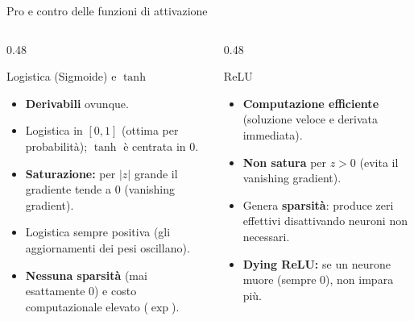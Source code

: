 \documentclass[aspectratio=169]{beamer}
\begin{document}
\begin{frame}{Pro e contro delle funzioni di attivazione}
  \small
  \begin{columns}[T, totalwidth=\textwidth]
    \begin{column}{0.48\textwidth}
      \begin{block}{\centering Logistica (Sigmoide) e $\tanh$}
        \begin{itemize}
          \setlength{\itemsep}{0.3em}
          \item[\textcolor{green!60!black}{\textbf{+}}] \textbf{Derivabili} ovunque.
          \item[\textcolor{green!60!black}{\textbf{+}}] Logistica in $[0,1]$ (ottima per probabilità); $\tanh$ è centrata in 0.
          \item[\textcolor{red}{\textbf{--}}] \textbf{Saturazione:} per $|z|$ grande il gradiente tende a 0 (vanishing gradient).
          \item[\textcolor{red}{\textbf{--}}] Logistica sempre positiva (gli aggiornamenti dei pesi oscillano).
          \item[\textcolor{red}{\textbf{--}}] \textbf{Nessuna sparsità} (mai esattamente 0) e costo computazionale elevato ($\exp$).
        \end{itemize}
      \end{block}
    \end{column}

    \begin{column}{0.48\textwidth}
      \begin{block}{\centering ReLU}
        \begin{itemize}
          \setlength{\itemsep}{0.3em}
          \item[\textcolor{green!60!black}{\textbf{+}}] \textbf{Computazione efficiente} (soluzione veloce e derivata immediata).
          \item[\textcolor{green!60!black}{\textbf{+}}] \textbf{Non satura} per $z > 0$ (evita il vanishing gradient).
          \item[\textcolor{green!60!black}{\textbf{+}}] Genera \textbf{sparsità}: produce zeri effettivi disattivando neuroni non necessari.
          \item[\textcolor{red}{\textbf{--}}] \textbf{Dying ReLU:} se un neurone muore (sempre $0$), non impara più.
        \end{itemize}
      \end{block}
    \end{column}
  \end{columns}
\end{frame}
\end{document}
